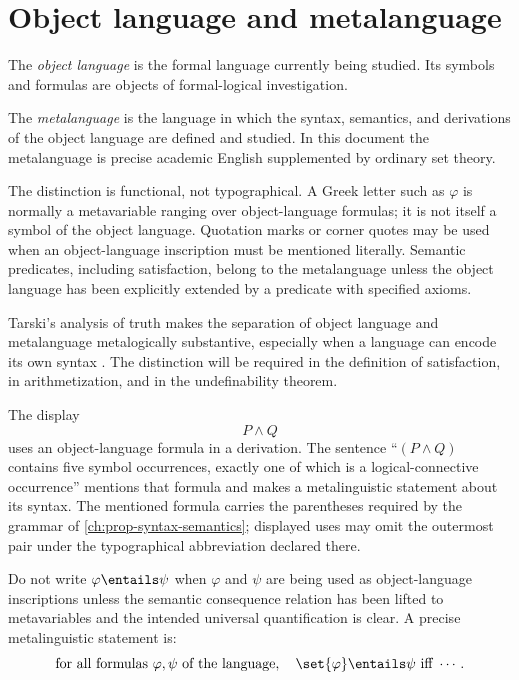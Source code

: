 \section{Object language and metalanguage}
\label{sec:levels-02}

\begin{definition}
The \emph{object language} is the formal language currently being studied.
Its symbols and formulas are objects of formal-logical investigation.
\end{definition}

\begin{definition}[Metalanguage]
The \emph{metalanguage} is the language in which the syntax, semantics, and
derivations of the object language are defined and studied.  In this document
the metalanguage is precise academic English supplemented by ordinary set
theory.
\end{definition}

The distinction is functional, not typographical.  A Greek letter such as
\(\varphi\) is normally a metavariable ranging over object-language formulas;
it is not itself a symbol of the object language.  Quotation marks or corner
quotes may be used when an object-language inscription must be mentioned
literally.  Semantic predicates, including satisfaction, belong to the
metalanguage unless the object language has been explicitly extended by a
predicate with specified axioms.

Tarski's analysis of truth makes the separation of object language and
metalanguage metalogically substantive, especially when a language can encode
its own syntax \cite{Tarski1983}.  The distinction will be required in the
definition of satisfaction, in arithmetization, and in the undefinability
theorem.

\begin{example}
The display
\[
  P \land Q
\]
uses an object-language formula in a derivation.  The sentence
``\((P\land Q)\) contains five symbol occurrences, exactly one of which is a
logical-connective occurrence'' mentions that formula and makes a
metalinguistic statement about its syntax.  The mentioned formula carries the
parentheses required by the grammar of \cref{ch:prop-syntax-semantics};
displayed uses may omit the outermost pair under the typographical
abbreviation declared there.
\end{example}

\begin{warning}
Do not write \(\varphi\entails\psi\) when \(\varphi\) and \(\psi\) are being
used as object-language inscriptions unless the semantic consequence relation
has been lifted to metavariables and the intended universal quantification is
clear.  A precise metalinguistic statement is:
\[
  \text{for all formulas }\varphi,\psi\text{ of the language},
  \quad \set{\varphi}\entails\psi\ \text{iff}\ \cdots.
\]
\end{warning}

